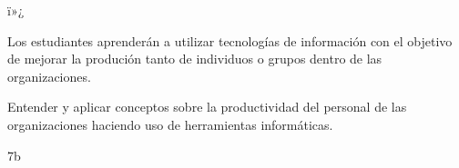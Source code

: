 ï»¿\begin{syllabus}


\begin{justification}
Los estudiantes aprenderán a utilizar tecnologías de información con el objetivo de mejorar
la produción tanto de individuos o grupos dentro de las organizaciones.
\end{justification}

\begin{goals}
\item Entender y aplicar conceptos  sobre la productividad del personal de las organizaciones haciendo uso de herramientas informáticas.
\end{goals}

\begin{outcomes}
\end{outcomes}

\begin{unit}{\LUONEDef}{\LUONEBib}{7}{b}
   \begin{topics}
   	\item \ITONETopicONExONExONE
      \begin{subtopics}
      	\item \ITONETopicONExONExONExTWO
      	\item \ITONETopicONExONExONExTHREE
      \end{subtopics}	
      \item \ITONETopicONExONExTHREE
      \item \ITONETopicONExONExFOUR
      \item \ITTWOTopicONExTWOxONE
      \begin{subtopics}
	      \item \ITTWOTopicONExTWOxONExFOUR
      \end{subtopics}	
      \item \ITTWOTopicONExTWOxTHREE
      \item \ITFOURTopicONExFOURxONE
      \item \ITFOURTopicONExFOURxTWO
      \item \ITSIXTopicONExSIXxONE
      \item \ITSIXTopicONExSIXxTHREE
      \item \ITSIXTopicONExSIXxNINE
      \item \OMCTWOTopicTWOxTWOxONEONE
      \item \OMCTWOTopicTWOxTWOxONESIX
      \item \OMCTHREETopicTWOxTHREExTHREE
      \item \TDSONETopicTHREExONExTWO
      \item \TDSONETopicTHREExONExFOUR
      \item \TDSONETopicTHREExONExFIVE
   \end{topics}
	\LUONEGoal
\end{unit}


\end{syllabus}
